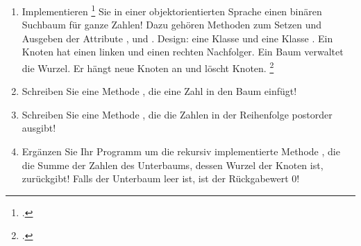 \documentclass{bschlangaul-aufgabe}
\begin{document}

\begin{enumerate}


\item Implementieren \footcite{examen:66112:2003:09}
Sie in einer objektorientierten Sprache einen binären Suchbaum für ganze
Zahlen! Dazu gehören Methoden zum Setzen und Ausgeben der Attribute
,  und
. Design: eine Klasse  und
eine Klasse . Ein Knoten hat einen linken und einen
rechten Nachfolger. Ein Baum verwaltet die Wurzel. Er hängt neue Knoten
an und löscht Knoten.
\footcite[Abgewandelt von Herbst 2003, Thema 2 Aufgabe 8, Seite 8, Seite 1, Aufgabe 2]{aud:pu:5}

\begin{bAntwort}
\end{bAntwort}


\item Schreiben Sie eine Methode , die eine
Zahl in den Baum einfügt!

\begin{bAntwort}
\end{bAntwort}


\item Schreiben Sie eine Methode , die die Zahlen in der Reihenfolge postorder
ausgibt!

\begin{bAntwort}
\end{bAntwort}


\item Ergänzen Sie Ihr Programm um die rekursiv implementierte Methode
, die die Summe der Zahlen des
Unterbaums, dessen Wurzel der Knoten ist, zurückgibt! Falls der
Unterbaum leer ist, ist der Rückgabewert 0!


\end{enumerate}
\end{document}

